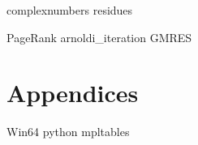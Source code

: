 \documentclass[nociteref]{SIAM-GH-book}
\begin{document}
{complexnumbers}
{residues}


{PageRank}
{arnoldi_iteration}
{GMRES}


\part{Appendices}
{Win64}
{python}
{mpltables}
\end{document}
